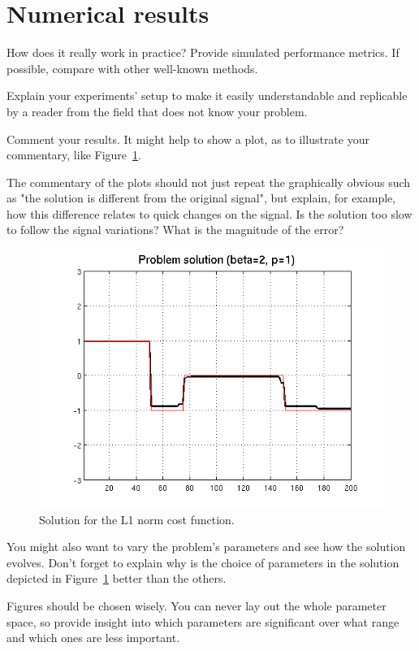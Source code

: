 \documentclass[a4paper]{IEEEtran}
\begin{document}
\section{Numerical results}
\label{sec:numerical-results}

How does it really work in practice? Provide simulated performance
metrics. If possible, compare with other well-known methods.

Explain your experiments' setup to make it easily understandable and
replicable by a reader from the field that does not know your problem.

Comment your results. It might help to show a plot, as to illustrate
your commentary, like Figure~\ref{fig:solution-l1}.


The commentary of the plots should not just repeat the graphically
obvious such as "the solution is different from the original signal",
but explain, for example, how this difference relates to quick changes
on the signal. Is the solution too slow to follow the signal
variations? What is the magnitude of the error?

\begin{figure}[htp]
  \centering
  \includegraphics[width=0.9\columnwidth]{./solution1}
  \caption{Solution for the L1 norm cost function.}
  \label{fig:solution-l1}
\end{figure}

You might also want to vary the problem's parameters and see how the
solution evolves. Don't forget to explain why is the choice of
parameters in the solution depicted in Figure~\ref{fig:solution-l1}
better than the others.

Figures should be chosen wisely. You can never lay out the whole
parameter space, so provide insight into which parameters are
significant over what range and which ones are less important.
\end{document}
